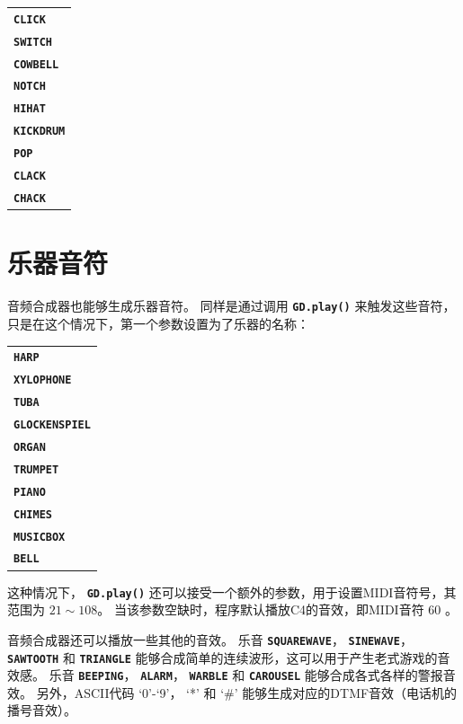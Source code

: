 \documentclass[10pt]{book}
\newcommand{\mach}[1]{\texttt{\textbf{#1}}}
\begin{document}
\begin{CJK}{UTF8}{gkai}
\vspace{10pt}
\begin{tabular}{l}
\mach{CLICK} \\
\mach{SWITCH} \\
\mach{COWBELL} \\
\mach{NOTCH} \\
\mach{HIHAT} \\
\mach{KICKDRUM} \\
\mach{POP} \\
\mach{CLACK} \\
\mach{CHACK} \\
\end{tabular}
\vspace{10pt}

\section{乐器音符}

音频合成器也能够生成乐器音符。
同样是通过调用 \mach{GD.play()} 来触发这些音符，只是在这个情况下，第一个参数设置为了乐器的名称：

\label{instruments}

\vspace{10pt}
\begin{tabular}{l}
\mach{HARP} \\
\mach{XYLOPHONE} \\
\mach{TUBA} \\
\mach{GLOCKENSPIEL} \\
\mach{ORGAN} \\
\mach{TRUMPET} \\
\mach{PIANO} \\
\mach{CHIMES} \\
\mach{MUSICBOX} \\
\mach{BELL}
\end{tabular}
\vspace{10pt}

\noindent
这种情况下， \mach{GD.play()} 还可以接受一个额外的参数，用于设置MIDI音符号，其范围为 $21\sim108$。
当该参数空缺时，程序默认播放C4的音效，即MIDI音符 $60$ 。

音频合成器还可以播放一些其他的音效。
乐音
\mach{SQUAREWAVE}，
\mach{SINEWAVE}，
\mach{SAWTOOTH} 和
\mach{TRIANGLE} 
能够合成简单的连续波形，这可以用于产生老式游戏的音效感。
乐音
\mach{BEEPING}，
\mach{ALARM}，
\mach{WARBLE} 和
\mach{CAROUSEL}
能够合成各式各样的警报音效。
另外，ASCII代码 `0'-`9'， `*' 和 `\#' 能够生成对应的DTMF音效（电话机的播号音效）。


\end{CJK}
\end{document}
